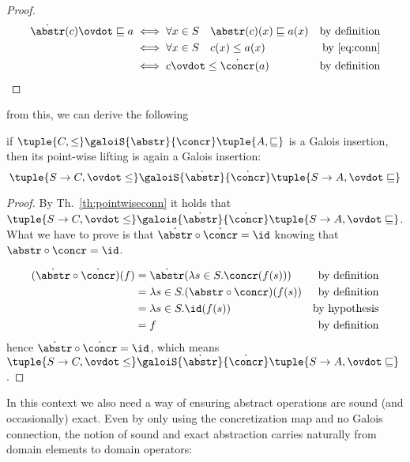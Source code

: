 \begin{proof}
  \begin{align*}
    \dot\abstr(c) \ovdot\sqsubseteq a & \iff \forall x\in S \quad \abstr(c)(x) \sqsubseteq a(x) & \text{by definition} \\
                                      & \iff \forall x\in S \quad c(x) \leq a(x) & \text{by~\eqref{eq:conn}} \\
                                      & \iff c \ovdot\leq \dot\concr(a) & \text{by definition}
  \end{align*}
\end{proof}

from this, we can derive the following
\begin{theorem}\label{th:liftingins}
  if
  \(\tuple{C, \leq} \galoiS{\abstr}{\concr} \tuple{A, \sqsubseteq}\)
  is a Galois insertion, then its point-wise lifting is again a Galois
  insertion:
  \begin{equation*}
    \tuple{S \to C, \ovdot\leq} \galoiS{\dot\abstr}{\dot\concr} \tuple{S\to A, \ovdot\sqsubseteq}
  \end{equation*}
\end{theorem}

\begin{proof}
  By Th.~\ref{th:pointwiseconn} it holds that
  \(\tuple{S \to C, \ovdot\leq} \galois{\dot\abstr}{\dot\concr}
  \tuple{S\to A, \ovdot\sqsubseteq}\). What we have to prove is that
  \(\dot\abstr \circ \dot\concr = \id\) knowing that
  \(\abstr \circ \concr = \id\).

  \begin{align*}
    (\dot\abstr \circ \dot\concr)(f) & = \dot\abstr(\lambda s\in S . \concr(f(s))) & \text{by definition} \\
                                     & = \lambda s\in S . (\abstr \circ \concr)(f(s)) & \text{by definition} \\
                                     & = \lambda s\in S . \id(f(s)) & \text{by hypothesis} \\
                                     & = f & \text{by definition}
  \end{align*}
  hence \(\dot\abstr \circ \dot\concr = \id\), which means
  \(\tuple{S \to C, \ovdot\leq} \galoiS{\dot\abstr}{\dot\concr}
  \tuple{S\to A, \ovdot\sqsubseteq}\).
\end{proof}

In this context we also need a way of ensuring abstract operations are
sound (and occasionally) exact. Even by only using the concretization
map and no Galois connection, the notion of sound and exact
abstraction carries naturally from domain elements to domain
operators:

